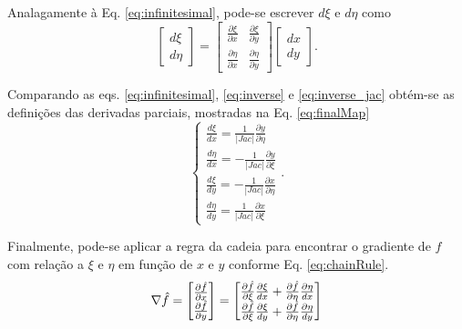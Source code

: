 Analagamente \`a Eq. \eqref{eq:infinitesimal}, pode-se escrever $d\xi$ e $d\eta$ como
\begin{equation}
    \begin{bmatrix}
        d\xi \\
        d\eta
    \end{bmatrix}
    =
    \begin{bmatrix}
        \frac{\partial \xi}{\partial x} & \frac{\partial \xi}{\partial y} \\
        \frac{\partial \eta}{\partial x} & \frac{\partial \eta}{\partial y}
    \end{bmatrix}
    \begin{bmatrix}
        dx\\
        dy
    \end{bmatrix}.
    \label{eq:infinitesimalInverse}
\end{equation}

Comparando as eqs. \eqref{eq:infinitesimal}, \eqref{eq:inverse} e \eqref{eq:inverse_jac} obt\'em-se as defini\c{c}\~oes das derivadas parciais, mostradas na Eq. \eqref{eq:finalMap}
\begin{equation}
    \label{eq:finalMap}
    \begin{cases}
        \frac{d\xi}{dx} =  \frac{1}{|Jac|}\frac{\partial y}{\partial \eta}\\
        \frac{d\eta}{dx} = -\frac{1}{|Jac|}\frac{\partial y}{\partial \xi}\\
        \frac{d\xi}{dy} = -\frac{1}{|Jac|}\frac{\partial x}{\partial \eta}\\
        \frac{d\eta}{dy} =  \frac{1}{|Jac|}\frac{\partial x}{\partial \xi}
    \end{cases}.
\end{equation}

Finalmente, pode-se aplicar a regra da cadeia para encontrar o gradiente de $f$ com rela\c{c}\~ao a $\xi$ e $\eta$ em fun\c{c}\~ao de $x$ e $y$ conforme Eq. \eqref{eq:chainRule}.
\begin{equation}
    \label{eq:chainRule}
    \nabla \hat f = 
    \begin{bmatrix}
        \frac{\partial \hat f}{\partial x} \\
        \frac{\partial \hat f}{\partial y}
    \end{bmatrix} = 
    \begin{bmatrix}
        \frac{\partial \hat f}{\partial \xi} \frac{\partial \xi }{dx} + \frac{\partial \hat f}{\partial \eta}\frac{\partial \eta}{dx}\\
        \frac{\partial \hat f}{\partial \xi} \frac{\partial \xi }{dy} + \frac{\partial \hat f}{\partial \eta}\frac{\partial \eta}{dy}
    \end{bmatrix}
\end{equation}

